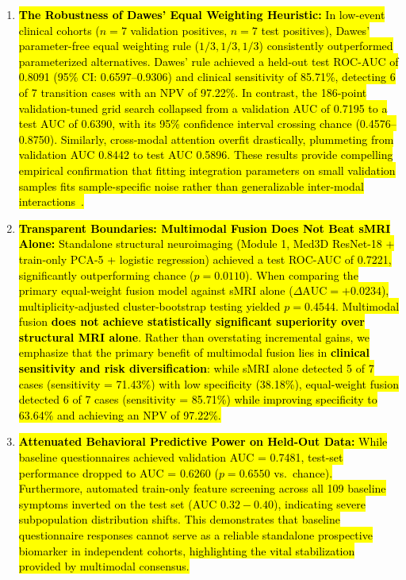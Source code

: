 \documentclass[10pt,letterpaper]{article}
\begin{document}
\begin{enumerate}
    \item \hl{\textbf{The Robustness of Dawes' Equal Weighting Heuristic:} In low-event clinical cohorts ($n=7$ validation positives, $n=7$ test positives), Dawes' parameter-free equal weighting rule ($1/3, 1/3, 1/3$) consistently outperformed parameterized alternatives. Dawes' rule achieved a held-out test ROC-AUC of 0.8091 (95\% CI: 0.6597--0.9306) and clinical sensitivity of 85.71\%, detecting 6 of 7 transition cases with an NPV of 97.22\%. In contrast, the 186-point validation-tuned grid search collapsed from a validation AUC of 0.7195 to a test AUC of 0.6390, with its 95\% confidence interval crossing chance (0.4576--0.8750). Similarly, cross-modal attention overfit drastically, plummeting from validation AUC 0.8442 to test AUC 0.5896. These results provide compelling empirical confirmation that fitting integration parameters on small validation samples fits sample-specific noise rather than generalizable inter-modal interactions~\cite{ref_dawes}.}
    \item \hl{\textbf{Transparent Boundaries: Multimodal Fusion Does Not Beat sMRI Alone:} Standalone structural neuroimaging (Module 1, Med3D ResNet-18 + train-only PCA-5 + logistic regression) achieved a test ROC-AUC of 0.7221, significantly outperforming chance ($p = 0.0110$). When comparing the primary equal-weight fusion model against sMRI alone ($\Delta\text{AUC} = +0.0234$), multiplicity-adjusted cluster-bootstrap testing yielded $p = 0.4544$. Multimodal fusion \textbf{does not achieve statistically significant superiority over structural MRI alone}. Rather than overstating incremental gains, we emphasize that the primary benefit of multimodal fusion lies in \textbf{clinical sensitivity and risk diversification}: while sMRI alone detected 5 of 7 cases (sensitivity = 71.43\%) with low specificity (38.18\%), equal-weight fusion detected 6 of 7 cases (sensitivity = 85.71\%) while improving specificity to 63.64\% and achieving an NPV of 97.22\%.}
    \item \hl{\textbf{Attenuated Behavioral Predictive Power on Held-Out Data:} While baseline questionnaires achieved validation AUC = 0.7481, test-set performance dropped to AUC = 0.6260 ($p = 0.6550$ vs.\ chance). Furthermore, automated train-only feature screening across all 109 baseline symptoms inverted on the test set (AUC $0.32-0.40$), indicating severe subpopulation distribution shifts. This demonstrates that baseline questionnaire responses cannot serve as a reliable standalone prospective biomarker in independent cohorts, highlighting the vital stabilization provided by multimodal consensus.}

\end{enumerate}
\end{document}
